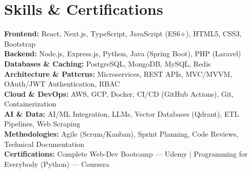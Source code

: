 \documentclass[letterpaper,11pt]{article}
\begin{document}
\section{Skills \& Certifications}
 \begin{itemize}[leftmargin=0.15in, label={}]
    \small{\item{
     \textbf{Frontend:} React, Next.js, TypeScript, JavaScript (ES6+), HTML5, CSS3, Bootstrap \\[3pt]
     \textbf{Backend:} Node.js, Express.js, Python, Java (Spring Boot), PHP (Laravel) \\[3pt]
     \textbf{Databases \& Caching:} PostgreSQL, MongoDB, MySQL, Redis \\[3pt]
     \textbf{Architecture \& Patterns:} Microservices, REST APIs, MVC/MVVM, OAuth/JWT Authentication, RBAC \\[3pt]
     \textbf{Cloud \& DevOps:} AWS, GCP, Docker, CI/CD (GitHub Actions), Git, Containerization \\[3pt]
     \textbf{AI \& Data:} AI/ML Integration, LLMs, Vector Databases (Qdrant), ETL Pipelines, Web Scraping \\[3pt]
     \textbf{Methodologies:} Agile (Scrum/Kanban), Sprint Planning, Code Reviews, Technical Documentation \\[3pt]
     \textbf{Certifications:} Complete Web-Dev Bootcamp --- Udemy \quad $|$ \quad Programming for Everybody (Python) --- Coursera
    }}
 \end{itemize}

\end{document}
